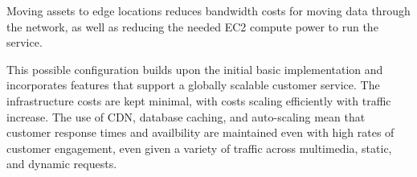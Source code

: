 Moving assets to edge locations reduces bandwidth costs for moving data through the network, as well as reducing the needed EC2 compute power to run the service.


This possible configuration builds upon the initial basic implementation and incorporates features that support a globally scalable customer service. The infrastructure costs are kept minimal, with costs scaling efficiently with traffic increase. The use of CDN, database caching, and auto-scaling mean that customer response times and availbility are maintained even with high rates of customer engagement, even given a variety of traffic across multimedia, static, and dynamic requests.
